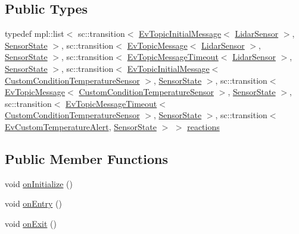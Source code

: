 \subsection*{Public Types}
\begin{DoxyCompactItemize}
\item 
typedef mpl\+::list$<$ sc\+::transition$<$ \hyperlink{structsmacc_1_1EvTopicInitialMessage}{Ev\+Topic\+Initial\+Message}$<$ \hyperlink{sensor__state_8h_a9db9e1944f88de79507758d08e4a2ee3}{Lidar\+Sensor} $>$, \hyperlink{structSensorState}{Sensor\+State} $>$, sc\+::transition$<$ \hyperlink{structsmacc_1_1EvTopicMessage}{Ev\+Topic\+Message}$<$ \hyperlink{sensor__state_8h_a9db9e1944f88de79507758d08e4a2ee3}{Lidar\+Sensor} $>$, \hyperlink{structSensorState}{Sensor\+State} $>$, sc\+::transition$<$ \hyperlink{structsmacc_1_1EvTopicMessageTimeout}{Ev\+Topic\+Message\+Timeout}$<$ \hyperlink{sensor__state_8h_a9db9e1944f88de79507758d08e4a2ee3}{Lidar\+Sensor} $>$, \hyperlink{structSensorState}{Sensor\+State} $>$, sc\+::transition$<$ \hyperlink{structsmacc_1_1EvTopicInitialMessage}{Ev\+Topic\+Initial\+Message}$<$ \hyperlink{classCustomConditionTemperatureSensor}{Custom\+Condition\+Temperature\+Sensor} $>$, \hyperlink{structSensorState}{Sensor\+State} $>$, sc\+::transition$<$ \hyperlink{structsmacc_1_1EvTopicMessage}{Ev\+Topic\+Message}$<$ \hyperlink{classCustomConditionTemperatureSensor}{Custom\+Condition\+Temperature\+Sensor} $>$, \hyperlink{structSensorState}{Sensor\+State} $>$, sc\+::transition$<$ \hyperlink{structsmacc_1_1EvTopicMessageTimeout}{Ev\+Topic\+Message\+Timeout}$<$ \hyperlink{classCustomConditionTemperatureSensor}{Custom\+Condition\+Temperature\+Sensor} $>$, \hyperlink{structSensorState}{Sensor\+State} $>$, sc\+::transition$<$ \hyperlink{structEvCustomTemperatureAlert}{Ev\+Custom\+Temperature\+Alert}, \hyperlink{structSensorState}{Sensor\+State} $>$ $>$ \hyperlink{structSensorState_aad643eee73f46db780c8f30fde51d23f}{reactions}
\end{DoxyCompactItemize}
\subsection*{Public Member Functions}
\begin{DoxyCompactItemize}
\item 
void \hyperlink{structSensorState_a6044eeac11b62bbc073ea844b29b96d7}{on\+Initialize} ()
\item 
void \hyperlink{structSensorState_a8737846a096cedd7656aa9030586ef39}{on\+Entry} ()
\item 
void \hyperlink{structSensorState_ab740060f1d0a2d5056a74da07cea994e}{on\+Exit} ()
\end{DoxyCompactItemize}

